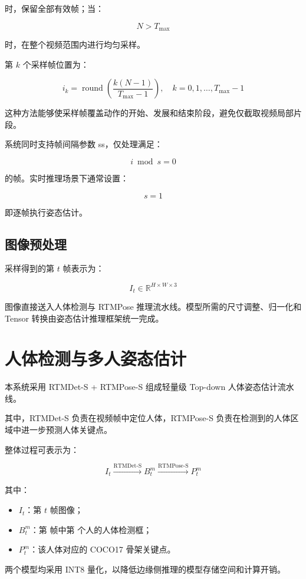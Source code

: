 时，保留全部有效帧；当：

\[
N>T_{\max}
\]

时，在整个视频范围内进行均匀采样。

第 \(k\) 个采样帧位置为：

\[
i_k=
\operatorname{round}
\left(
\frac{k(N-1)}{T_{\max}-1}
\right),
\quad
k=0,1,\ldots,T_{\max}-1
\]

这种方法能够使采样帧覆盖动作的开始、发展和结束阶段，避免仅截取视频局部片段。

系统同时支持帧间隔参数 ss，仅处理满足：

\[
i\bmod s=0
\]

的帧。实时推理场景下通常设置：

\[
s=1
\]

即逐帧执行姿态估计。

\subsection{图像预处理}

采样得到的第 \(t\) 帧表示为：

\[
I_t\in\mathbb{R}^{H\times W\times3}
\]

图像直接送入人体检测与 RTMPose 推理流水线。模型所需的尺寸调整、归一化和 Tensor 转换由姿态估计推理框架统一完成。

\section{人体检测与多人姿态估计}

本系统采用 RTMDet-S + RTMPose-S 组成轻量级 Top-down 人体姿态估计流水线。

其中，RTMDet-S 负责在视频帧中定位人体，RTMPose-S 负责在检测到的人体区域中进一步预测人体关键点。

整体过程可表示为：

\[
I_t
\xrightarrow{\text{RTMDet-S}}
B_t^m
\xrightarrow{\text{RTMPose-S}}
P_t^m
\]

其中：

\begin{itemize}
\item \(I_t\)：第 \(t\) 帧图像；
\item \(B_t^m\)：第  帧中第  个人的人体检测框；
\item \(P_t^m\)：该人体对应的 COCO17 骨架关键点。
\end{itemize}

两个模型均采用 INT8 量化，以降低边缘侧推理的模型存储空间和计算开销。

